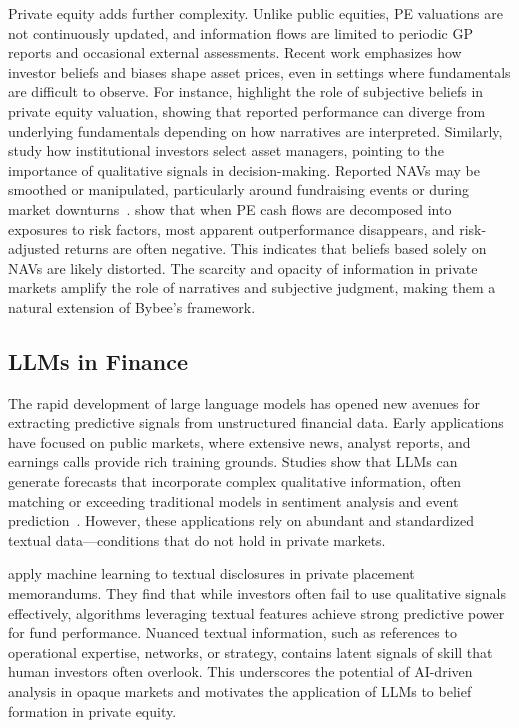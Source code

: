 Private equity adds further complexity.
Unlike public equities, PE valuations are not continuously updated, and information flows are limited to periodic GP reports and occasional external assessments.
Recent work emphasizes how investor beliefs and biases shape asset prices, even in settings where fundamentals are difficult to observe.
For instance, \cite{ermakov2024believe} highlight the role of subjective beliefs in private equity valuation, showing that reported performance can diverge from underlying fundamentals depending on how narratives are interpreted.
Similarly, \cite{brown2022finding} study how institutional investors select asset managers, pointing to the importance of qualitative signals in decision-making.
Reported NAVs may be smoothed or manipulated, particularly around fundraising events or during market downturns~\citep{brown2008private}.
\cite{gupta2020valuing} show that when PE cash flows are decomposed into exposures to risk factors, most apparent outperformance disappears, and risk-adjusted returns are often negative.
This indicates that beliefs based solely on NAVs are likely distorted.
The scarcity and opacity of information in private markets amplify the role of narratives and subjective judgment, making them a natural extension of Bybee’s framework.

\subsection{LLMs in Finance}\label{sec:llms-in-finance}

The rapid development of large language models has opened new avenues for extracting predictive signals from unstructured financial data.
Early applications have focused on public markets, where extensive news, analyst reports, and earnings calls provide rich training grounds.
Studies show that LLMs can generate forecasts that incorporate complex qualitative information, often matching or exceeding traditional models in sentiment analysis and event prediction~\citep{ke2019machine, chen2023finbert}.
However, these applications rely on abundant and standardized textual data—conditions that do not hold in private markets.

\cite{fernandez2023limited} apply machine learning to textual disclosures in private placement memorandums.
They find that while investors often fail to use qualitative signals effectively, algorithms leveraging textual features achieve strong predictive power for fund performance.
Nuanced textual information, such as references to operational expertise, networks, or strategy, contains latent signals of skill that human investors often overlook.
This underscores the potential of AI-driven analysis in opaque markets and motivates the application of LLMs to belief formation in private equity.


